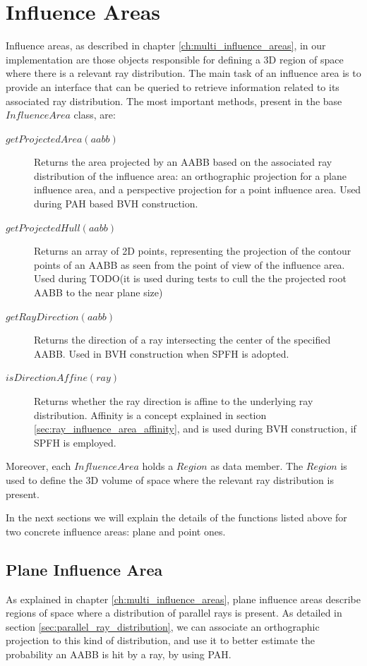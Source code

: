 \documentclass{PoliMi_MasterThesis}
\begin{document}
\section{Influence Areas} \label{sec:influence_areas}
Influence areas, as described in chapter \ref{ch:multi_influence_areas}, in our implementation are those objects responsible for defining a 3D region of space where there is a relevant ray distribution. The main task of an influence area is to provide an interface that can be queried to retrieve information related to its associated ray distribution. The most important methods, present in the base $InfluenceArea$ class, are:
\begin{description}
	\item[\boldmath$getProjectedArea(aabb)$] Returns the area projected by an AABB based on the associated ray distribution of the influence area: an orthographic projection for a plane influence area, and a perspective projection for a point influence area. Used during PAH based BVH construction.
	\item[\boldmath$getProjectedHull(aabb)$] Returns an array of 2D points, representing the projection of the contour points of an AABB as seen  from the point of view of the influence area. Used during TODO(it is used during tests to cull the the projected root AABB to the near plane size)
	\item[\boldmath$getRayDirection(aabb)$] Returns the direction of a ray intersecting the center of the specified AABB. Used in BVH construction when SPFH is adopted.
	\item[\boldmath$isDirectionAffine(ray)$] Returns whether the ray direction is affine to the underlying ray distribution. Affinity is a concept explained in section \ref{sec:ray_influence_area_affinity}, and is used during BVH construction, if SPFH is employed.
\end{description}

Moreover, each $InfluenceArea$ holds a $Region$ as data member. The $Region$ is used to define the 3D volume of space where the relevant ray distribution is present.

In the next sections we will explain the details of the functions listed above for two concrete influence areas: plane and point ones.

\subsection{Plane Influence Area} \label{ssec:plane_influence_area}
As explained in chapter \ref{ch:multi_influence_areas}, plane influence areas describe regions of space where a distribution of parallel rays is present. As detailed in section \ref{sec:parallel_ray_distribution}, we can associate an orthographic projection to this kind of distribution, and use it to better estimate the probability an AABB is hit by a ray, by using PAH.
\end{document}
